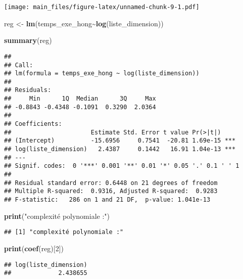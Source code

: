 \documentclass[
]{article}
\newenvironment{Shaded}{\begin{snugshade}}{\end{snugshade}}
\newcommand{\DecValTok}[1]{\textcolor[rgb]{0.00,0.00,0.81}{#1}}
\newcommand{\FunctionTok}[1]{\textcolor[rgb]{0.13,0.29,0.53}{\textbf{#1}}}
\newcommand{\NormalTok}[1]{#1}
\newcommand{\OtherTok}[1]{\textcolor[rgb]{0.56,0.35,0.01}{#1}}
\newcommand{\SpecialCharTok}[1]{\textcolor[rgb]{0.81,0.36,0.00}{\textbf{#1}}}
\newcommand{\StringTok}[1]{\textcolor[rgb]{0.31,0.60,0.02}{#1}}
\begin{document}
\texttt{[image: main\_files/figure-latex/unnamed-chunk-9-1.pdf]}

\begin{Shaded}
\begin{Highlighting}[]
\NormalTok{reg }\OtherTok{\textless{}{-}} \FunctionTok{lm}\NormalTok{(temps\_exe\_hong}\SpecialCharTok{\textasciitilde{}}\FunctionTok{log}\NormalTok{(liste\_dimension))}

\FunctionTok{summary}\NormalTok{(reg)}
\end{Highlighting}
\end{Shaded}

\begin{verbatim}
## 
## Call:
## lm(formula = temps_exe_hong ~ log(liste_dimension))
## 
## Residuals:
##     Min      1Q  Median      3Q     Max 
## -0.8843 -0.4348 -0.1091  0.3290  2.0364 
## 
## Coefficients:
##                      Estimate Std. Error t value Pr(>|t|)    
## (Intercept)          -15.6956     0.7541  -20.81 1.69e-15 ***
## log(liste_dimension)   2.4387     0.1442   16.91 1.04e-13 ***
## ---
## Signif. codes:  0 '***' 0.001 '**' 0.01 '*' 0.05 '.' 0.1 ' ' 1
## 
## Residual standard error: 0.6448 on 21 degrees of freedom
## Multiple R-squared:  0.9316, Adjusted R-squared:  0.9283 
## F-statistic:   286 on 1 and 21 DF,  p-value: 1.041e-13
\end{verbatim}

\begin{Shaded}
\begin{Highlighting}[]
\FunctionTok{print}\NormalTok{(}\StringTok{"complexité polynomiale :"}\NormalTok{)}
\end{Highlighting}
\end{Shaded}

\begin{verbatim}
## [1] "complexité polynomiale :"
\end{verbatim}

\begin{Shaded}
\begin{Highlighting}[]
\FunctionTok{print}\NormalTok{(}\FunctionTok{coef}\NormalTok{(reg)[}\DecValTok{2}\NormalTok{])}
\end{Highlighting}
\end{Shaded}

\begin{verbatim}
## log(liste_dimension) 
##             2.438655
\end{verbatim}

\hypertarget{section-16}{%
\subsection{}\label{section-16}}
\end{document}
